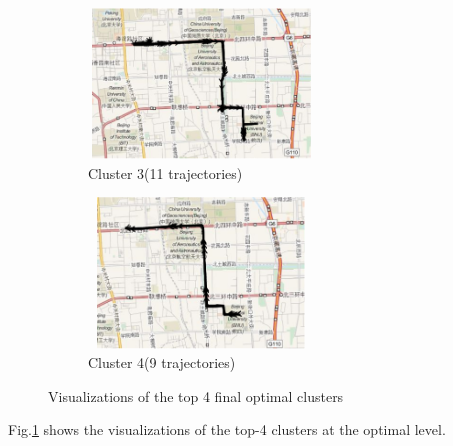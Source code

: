\begin{figure}
    \begin{subfigure}[t]{.5\textwidth}
        \centering
        \includegraphics[width=6cm,height=4cm,keepaspectratio]{figs/new/FinalCluster3.eps}
        \caption{Cluster 3(11 trajectories)}
    \end{subfigure}%
    \begin{subfigure}[t]{.5\textwidth}
        \centering
        \includegraphics[width=6cm,height=4cm,keepaspectratio]{figs/new/FinalCluster4.eps}
        \caption{Cluster 4(9 trajectories)}
    \end{subfigure}
    \caption{Visualizations of the top 4 final optimal clusters}
    \label{fig:finalClusters}
\end{figure}

Fig.\ref{fig:finalClusters} shows the visualizations of the top-4 clusters at the optimal level. 
